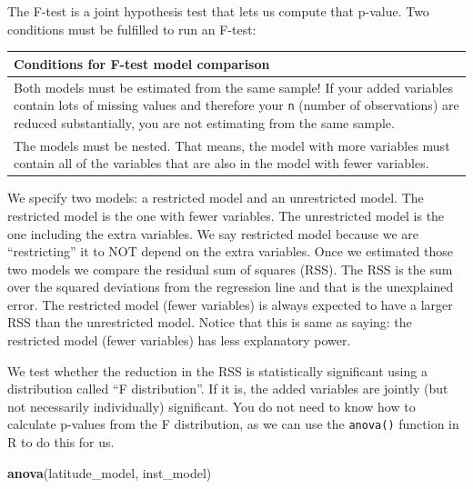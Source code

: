 \documentclass[]{article}
\newenvironment{Shaded}{\begin{snugshade}}{\end{snugshade}}
\newcommand{\KeywordTok}[1]{\textcolor[rgb]{0.13,0.29,0.53}{\textbf{#1}}}
\newcommand{\NormalTok}[1]{#1}
\theoremstyle{definition}
\theoremstyle{definition}
\theoremstyle{definition}
\theoremstyle{remark}
\begin{document}
The F-test is a joint hypothesis test that lets us compute that p-value.
Two conditions must be fulfilled to run an F-test:

\begin{longtable}[]{@{}l@{}}
\toprule
\begin{minipage}[b]{0.96\columnwidth}\raggedright\strut
Conditions for F-test model comparison\strut
\end{minipage}\tabularnewline
\midrule
\endhead
\begin{minipage}[t]{0.96\columnwidth}\raggedright\strut
Both models must be estimated from the same sample! If your added
variables contain lots of missing values and therefore your \texttt{n}
(number of observations) are reduced substantially, you are not
estimating from the same sample.\strut
\end{minipage}\tabularnewline
\begin{minipage}[t]{0.96\columnwidth}\raggedright\strut
The models must be nested. That means, the model with more variables
must contain all of the variables that are also in the model with fewer
variables.\strut
\end{minipage}\tabularnewline
\bottomrule
\end{longtable}

We specify two models: a restricted model and an unrestricted model. The
restricted model is the one with fewer variables. The unrestricted model
is the one including the extra variables. We say restricted model
because we are ``restricting'' it to NOT depend on the extra variables.
Once we estimated those two models we compare the residual sum of
squares (RSS). The RSS is the sum over the squared deviations from the
regression line and that is the unexplained error. The restricted model
(fewer variables) is always expected to have a larger RSS than the
unrestricted model. Notice that this is same as saying: the restricted
model (fewer variables) has less explanatory power.

We test whether the reduction in the RSS is statistically significant
using a distribution called ``F distribution''. If it is, the added
variables are jointly (but not necessarily individually) significant.
You do not need to know how to calculate p-values from the F
distribution, as we can use the \texttt{anova()} function in R to do
this for us.

\begin{Shaded}
\begin{Highlighting}[]
\KeywordTok{anova}\NormalTok{(latitude_model, inst_model)}
\end{Highlighting}
\end{Shaded}
\end{document}
